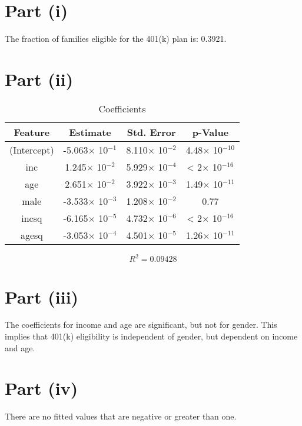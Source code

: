 \documentclass{./solution}
\begin{document}
    \begin{solution}[Wooldridge C7.9]
        \section*{Part (i)}
            The fraction of families eligible for the 401(k) plan is: 0.3921.

        \section*{Part (ii)}
            \begin{table}[H]
                \caption{Coefficients}
                \begin{tabularx}{\textwidth}{C C C C}
                    \toprule
                    Feature & Estimate & Std. Error & p-Value \\
                    \midrule
                    (Intercept) & -5.063$\times$ 10$^{-1}$ & 8.110$\times$ 10$^{-2}$ & 4.48$\times$ 10$^{-10}$ \\
                    inc         &  1.245$\times$ 10$^{-2}$ & 5.929$\times$ 10$^{-4}$ &  < 2$\times$ 10$^{-16}$ \\
                    age         &  2.651$\times$ 10$^{-2}$ & 3.922$\times$ 10$^{-3}$ & 1.49$\times$ 10$^{-11}$ \\
                    male        & -3.533$\times$ 10$^{-3}$ & 1.208$\times$ 10$^{-2}$ &     0.77 \\
                    incsq       & -6.165$\times$ 10$^{-5}$ & 4.732$\times$ 10$^{-6}$ &  < 2$\times$ 10$^{-16}$ \\
                    agesq       & -3.053$\times$ 10$^{-4}$ & 4.501$\times$ 10$^{-5}$ & 1.26$\times$ 10$^{-11}$ \\
                    \bottomrule
                \end{tabularx}
            \end{table}
            \vspace{-5mm}
            $$ R^2 = 0.09428 $$

        \section*{Part (iii)}
            The coefficients for income and age are significant, but not for gender.
            This implies that 401(k) eligibility is independent of gender, but dependent on income and age.

        \section*{Part (iv)}
            There are no fitted values that are negative or greater than one.


\end{solution}
\end{document}
